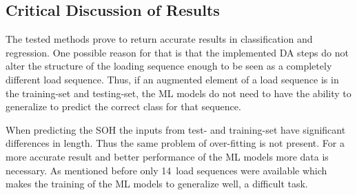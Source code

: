 \subsection{Critical Discussion of Results}

The tested methods prove to return accurate results in classification and regression. One possible reason for that is that the implemented DA steps do not alter the structure of the loading sequence enough to be seen as a completely different load sequence. Thus, if an augmented element of a load sequence is in the training-set and testing-set, the ML models do not need to have the ability to generalize to predict the correct class for that sequence. 

When predicting the SOH the inputs from test- and training-set have significant differences in length. Thus the same problem of over-fitting is not present. For a more accurate result and better performance of the ML models more data is necessary. As mentioned before only 14~load sequences were available which makes the training of the ML models to generalize well, a difficult task.   

